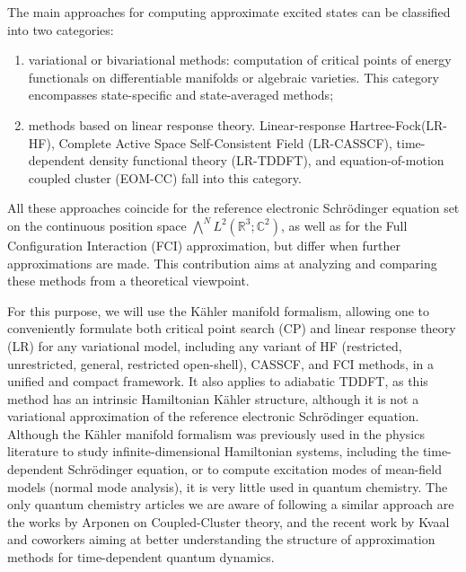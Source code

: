 \documentclass[11pt]{article}
\def\R{{\mathbb R}}
\def\C{{\mathbb C}}
\begin{document}
The main approaches for computing approximate excited states can be classified into two categories:
\begin{enumerate}
    \item variational or bivariational methods: computation of critical points of energy functionals on differentiable manifolds or algebraic varieties. This category encompasses state-specific and state-averaged methods;\supercite{Docken1972,Nicolaides1984,Hirao1993, Kossoski2021,Kossoski2023,Marie2023,Saade2024}
    \item methods based on linear response theory. Linear-response Hartree-Fock\supercite{Jrgensen1970, Olsen1988,Dalgaard1982,Matsuo2001,Ebata2010,Miura2010,vanMeer2017}(LR-HF), Complete Active Space Self-Consistent Field\supercite{Berger2000,Stlring2002,HelmichParis2019benchmarks, HelmichParis2019} (LR-CASSCF), time-dependent density functional theory\supercite{Runge1984,Gross1985, Onida2002,CASIDA1995,Casida1998,Casida2005} (LR-TDDFT), and equation-of-motion coupled cluster\supercite{Mukherjee1979,Sekino1984,Nooijen1995,Nooijen1997,Nooijen1997anewmethod,Geertsen1989,Stanton1993,koch1990coupled,Comeau1993} (EOM-CC) fall into this category.
\end{enumerate}
All these approaches coincide for the reference electronic Schr\"odinger equation set on the continuous position space $\bigwedge^N L^2(\R^3;\C^2)$, as well as for the Full Configuration Interaction (FCI) approximation,\supercite{Knowles1984,Olsen1990} but differ when further approximations are made. This contribution aims at analyzing and comparing these methods from a theoretical viewpoint.

\medskip

For this purpose, we will use the K\"ahler manifold formalism, allowing one to conveniently formulate both critical point search (CP) and linear response theory (LR)  for any variational model,\supercite{Rowe1980} including any variant of HF \supercite{Hartree1928,Slater1928, fock1930naherungsmethode,hartree1935self} (restricted, unrestricted, general, restricted open-shell), CASSCF,\supercite{Roos1980} and FCI\supercite{Knowles1984,Olsen1990} methods, in a unified and compact framework. It also applies to adiabatic TDDFT,\supercite{marques2006time,marques2012fundamentals} as this method has an intrinsic Hamiltonian K\"ahler structure, although it is not a variational approximation of the reference electronic Schr\"odinger equation. Although the K\"ahler manifold formalism was previously used in the physics literature to study infinite-dimensional Hamiltonian systems, including the time-dependent Schr\"odinger equation,\supercite{ChernoffMarsden1974} or to compute excitation modes of mean-field models (normal mode analysis),\supercite{Rowe1980} it is very little used in quantum chemistry. The only quantum chemistry articles we are aware of following a similar approach are the works by Arponen\supercite{Arponen1983,Arponen1991} on Coupled-Cluster theory, and the recent work by Kvaal and coworkers\supercite{Kvaal2025} aiming at better understanding the structure of approximation methods for time-dependent
quantum dynamics.
\end{document}
